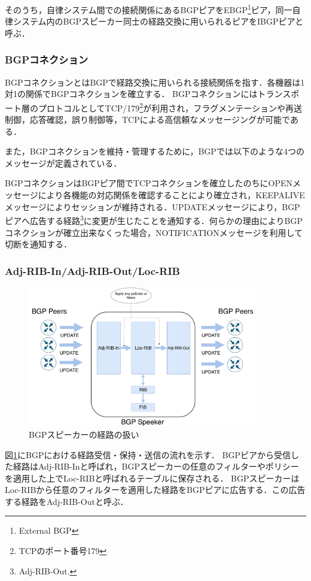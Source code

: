 そのうち，自律システム間での接続関係にあるBGPピアをEBGP\footnote{External BGP}ピア，同一自律システム内のBGPスピーカー同士の経路交換に用いられるピアをIBGPピアと呼ぶ．

\subsubsection{BGPコネクション}
BGPコネクションとはBGPで経路交換に用いられる接続関係を指す．各機器は1対1の関係でBGPコネクションを確立する．
BGPコネクションにはトランスポート層のプロトコルとしてTCP/179\footnote{TCP\cite{RFC793}のポート番号179}が利用され，フラグメンテーションや再送制御，応答確認，誤り制御等，TCPによる高信頼なメッセージングが可能である．

また，BGPコネクションを維持・管理するために，BGPでは以下のような4つのメッセージが定義されている．

BGPコネクションはBGPピア間でTCPコネクションを確立したのちにOPENメッセージにより各機能の対応関係を確認することにより確立され，KEEPALIVEメッセージによりセッションが維持される．UPDATEメッセージにより，BGPピアへ広告する経路\footnote{Adj-RIB-Out.}に変更が生じたことを通知する．何らかの理由によりBGPコネクションが確立出来なくった場合，NOTIFICATIONメッセージを利用して切断を通知する．

\subsubsection{Adj-RIB-In/Adj-RIB-Out/Loc-RIB}
\begin{figure}[h]
    \begin{center}
    \includegraphics[width=10cm,pagebox=cropbox,clip]{img/bgp-rib-model.pdf}
    \end{center}
    \caption{BGPスピーカーの経路の扱い}
    \label{fig:bgp-rib-model}
\end{figure}
図\ref{fig:bgp-rib-model}にBGPにおける経路受信・保持・送信の流れを示す．
BGPピアから受信した経路はAdj-RIB-Inと呼ばれ，BGPスピーカーの任意のフィルターやポリシーを適用した上でLoc-RIBと呼ばれるテーブルに保存される．
BGPスピーカーはLoc-RIBから任意のフィルターを適用した経路をBGPピアに広告する．この広告する経路をAdj-RIB-Outと呼ぶ．




